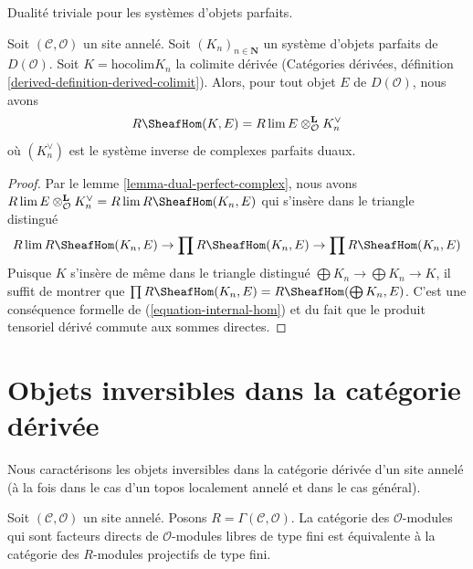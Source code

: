 \begin{lemma}
\label{lemma-colim-and-lim-of-duals}
\begin{slogan}
Dualité triviale pour les systèmes d'objets parfaits.
\end{slogan}
Soit $(\mathcal{C}, \mathcal{O})$ un site annelé. Soit
$(K_n)_{n \in \mathbf{N}}$ un système d'objets parfaits de $D(\mathcal{O})$.
Soit $K = \text{hocolim} K_n$ la colimite dérivée (Catégories dérivées,
définition \ref{derived-definition-derived-colimit}). Alors, pour tout objet
$E$ de $D(\mathcal{O})$, nous avons
$$
R\SheafHom(K, E) = R\lim E \otimes^\mathbf{L}_\mathcal{O} K_n^\vee
$$
où $(K_n^\vee)$ est le système inverse de complexes parfaits duaux.
\end{lemma}

\begin{proof}
Par le lemme \ref{lemma-dual-perfect-complex}, nous avons
$R\lim E \otimes^\mathbf{L}_\mathcal{O} K_n^\vee =
R\lim R\SheafHom(K_n, E)$
qui s'insère dans le triangle distingué
$$
R\lim R\SheafHom(K_n, E) \to
\prod R\SheafHom(K_n, E) \to
\prod R\SheafHom(K_n, E)
$$
Puisque $K$ s'insère de même dans le triangle distingué
$\bigoplus K_n \to \bigoplus K_n \to K$, il suffit de montrer que
$\prod R\SheafHom(K_n, E) = R\SheafHom(\bigoplus K_n, E)$. C'est une
conséquence formelle de (\ref{equation-internal-hom}) et du fait que le
produit tensoriel dérivé commute aux sommes directes.
\end{proof}






\section{Objets inversibles dans la catégorie dérivée}
\label{section-invertible-D-or-R}

\noindent
Nous caractérisons les objets inversibles dans la catégorie dérivée d'un site
annelé (à la fois dans le cas d'un topos localement annelé et dans le cas
général).

\begin{lemma}
\label{lemma-category-summands-finite-free}
Soit $(\mathcal{C}, \mathcal{O})$ un site annelé. Posons
$R = \Gamma(\mathcal{C}, \mathcal{O})$. La catégorie des
$\mathcal{O}$-modules qui sont facteurs directs de $\mathcal{O}$-modules
libres de type fini est équivalente à la catégorie des $R$-modules projectifs
de type fini.
\end{lemma}

